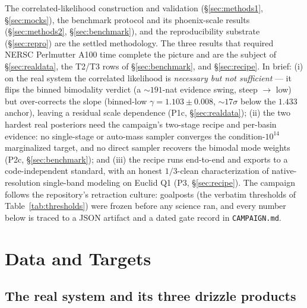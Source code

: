 \documentclass[11pt,letterpaper]{article}
\newcommand{\gammaEPL}{\ensuremath{\gamma}}
\begin{document}
The correlated-likelihood construction and validation (\S\ref{sec:methods1},
\S\ref{sec:mocks}), the benchmark protocol and its phoenix-scale results
(\S\ref{sec:methods2}, \S\ref{sec:benchmark}), and the reproducibility
substrate (\S\ref{sec:repro}) are the settled methodology. The three results
that required NERSC Perlmutter A100 time complete the picture and are the
subject of \S\ref{sec:realdata}, the T2/T3 rows of \S\ref{sec:benchmark}, and
\S\ref{sec:recipe}. In brief: (i) on the real system the correlated likelihood
is {\it necessary but not sufficient} --- it flips the binned bimodality
verdict (a $\sim$$191$-nat evidence swing, steep $\to$ low) but over-corrects
the slope (binned-low $\gammaEPL=1.103\pm0.008$, $\sim$$17\sigma$ below the
$1.433$ anchor), leaving a residual scale dependence (P1c, \S\ref{sec:realdata});
(ii) the two hardest real posteriors need the campaign's two-stage recipe and
per-basin evidence: no single-stage or auto-mass sampler converges the
condition-$10^{14}$ marginalized target, and no direct sampler recovers the
bimodal mode weights (P2c, \S\ref{sec:benchmark}); and (iii) the recipe runs
end-to-end and exports to a code-independent standard, with an honest
$1/3$-clean characterization of native-resolution single-band modeling on
Euclid Q1 (P3, \S\ref{sec:recipe}). The campaign follows the repository's
retraction culture: goalposts (the verbatim thresholds of
Table~\ref{tab:thresholds}) were frozen before any science ran, and every
number below is traced to a JSON artifact and a dated gate record in
\texttt{CAMPAIGN.md}.

\section{Data and Targets}
\label{sec:data}

\subsection{The real system and its three drizzle products}
\end{document}
